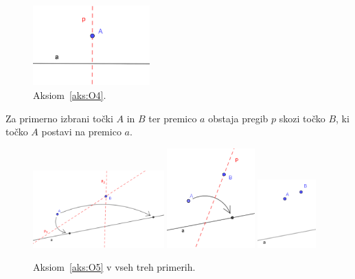 \begin{figure}[h!]
    \centering
    \includegraphics[width=0.4\textwidth]{images/origami_aksiomi/O4.png}
    \caption[Aksiom~\ref{aks:O4}]{Aksiom~\ref{aks:O4}.}
    \label{fig:O4}
\end{figure}

\begin{aksiom}
    \label{aks:O5}
    Za primerno izbrani točki $A$ in $B$ ter premico $a$ obstaja pregib $p$ skozi točko $B$, ki točko $A$ postavi na premico $a$.
\end{aksiom}

\begin{figure}[h!]
    \centering
    \includegraphics[width=0.45\textwidth]{images/origami_aksiomi/O5a.png}
    \includegraphics[width=0.3\textwidth]{images/origami_aksiomi/O5b.png}
    \includegraphics[width=0.2\textwidth]{images/origami_aksiomi/O5c.png}
    \caption[Aksiom~\ref{aks:O5}]{Aksiom~\ref{aks:O5} v vseh treh primerih.}
    \label{fig:O5}
\end{figure}


